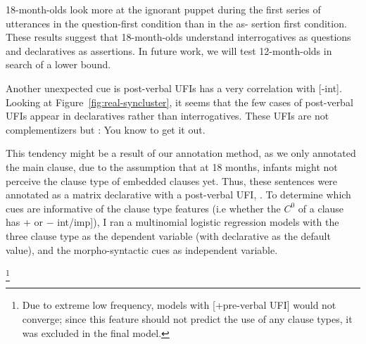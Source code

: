 18-month-olds look more at the ignorant puppet during the first series of utterances in the question-first condition than in the as- sertion first condition. These results suggest that 18-month-olds understand interrogatives as questions and declaratives as assertions. In future work, we will test 12-month-olds in search of a lower bound.


Another unexpected cue is post-verbal UFIs has a very correlation with [-int]. Looking at Figure~\ref{fig:real-syncluster}, it seems that the few cases of post-verbal UFIs appear in declaratives rather than interrogatives. These UFIs are not complementizers but :
You know  to get it out.
\eex

This tendency might be a result of our annotation method, as we only annotated the main clause, due to the assumption that at 18 months, infants might not perceive the clause type of embedded clauses yet. Thus, these sentences were annotated as a matrix declarative with a post-verbal UFI, . 
To determine which cues are informative of the clause type features (i.e whether the $C^{0}$ of a clause has + or $-$ int/imp]), I ran a multinomial logistic regression models with the three clause type as the dependent variable (with declarative as the default value), and the morpho-syntactic cues as independent variable. 


\footnote{Due to extreme low frequency, models with [+pre-verbal UFI] would not converge; since this feature should not predict the use of any clause types, it was excluded in the final model.} 





